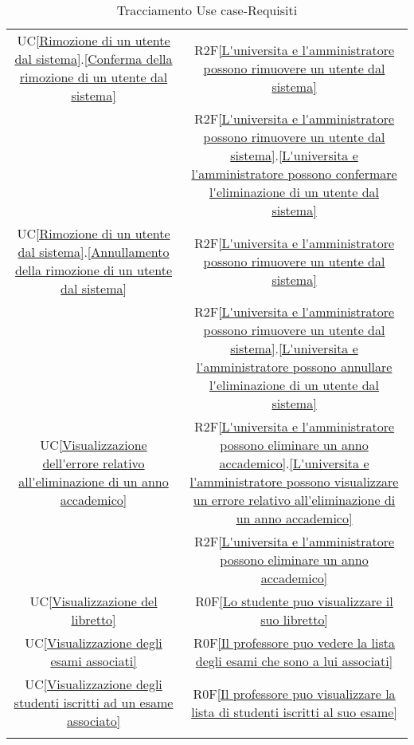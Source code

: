 \begin{longtable}{|c|c|}
\hline
UC\ref{Rimozione di un utente dal sistema}.\ref{Conferma della rimozione di un utente dal sistema} & R2F\ref{L'universita e l'amministratore possono rimuovere un utente dal sistema}\\
& R2F\ref{L'universita e l'amministratore possono rimuovere un utente dal sistema}.\ref{L'universita e l'amministratore possono confermare l'eliminazione di un utente dal sistema}\\
\hline
UC\ref{Rimozione di un utente dal sistema}.\ref{Annullamento della rimozione di un utente dal sistema} & R2F\ref{L'universita e l'amministratore possono rimuovere un utente dal sistema}\\
& R2F\ref{L'universita e l'amministratore possono rimuovere un utente dal sistema}.\ref{L'universita e l'amministratore possono annullare l'eliminazione di un utente dal sistema}\\
\hline
UC\ref{Visualizzazione dell'errore relativo all'eliminazione di un anno accademico} & R2F\ref{L'universita e l'amministratore possono eliminare un anno accademico}.\ref{L'universita e l'amministratore possono visualizzare un errore relativo all'eliminazione di un anno accademico}\\
& R2F\ref{L'universita e l'amministratore possono eliminare un anno accademico}\\
\hline
UC\ref{Visualizzazione del libretto} & R0F\ref{Lo studente puo visualizzare il suo libretto}\\
\hline
UC\ref{Visualizzazione degli esami associati} & R0F\ref{Il professore puo vedere la lista degli esami che sono a lui associati}\\
\hline
UC\ref{Visualizzazione degli studenti iscritti ad un esame associato} & R0F\ref{Il professore puo visualizzare la lista di studenti iscritti al suo esame}\\
\hline
\caption[Tracciamento Use case-Requisiti]{Tracciamento Use case-Requisiti}
\label{tabella:requi-usecase}
\end{longtable}
\clearpage
